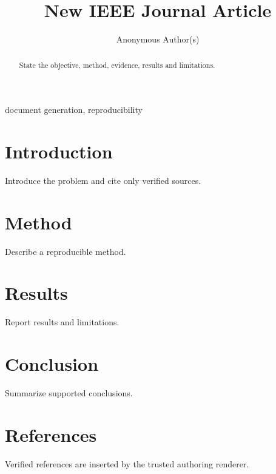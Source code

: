 \documentclass[journal]{IEEEtran}
\title{New IEEE Journal Article}
\author{Anonymous Author(s)}
\begin{document}
\maketitle
\begin{abstract}State the objective, method, evidence, results and limitations.\end{abstract}
\begin{IEEEkeywords}document generation, reproducibility\end{IEEEkeywords}
\section{Introduction}
Introduce the problem and cite only verified sources.
\section{Method}
Describe a reproducible method.
\section{Results}
Report results and limitations.
\section{Conclusion}
Summarize supported conclusions.
\section*{References}
Verified references are inserted by the trusted authoring renderer.
\end{document}

